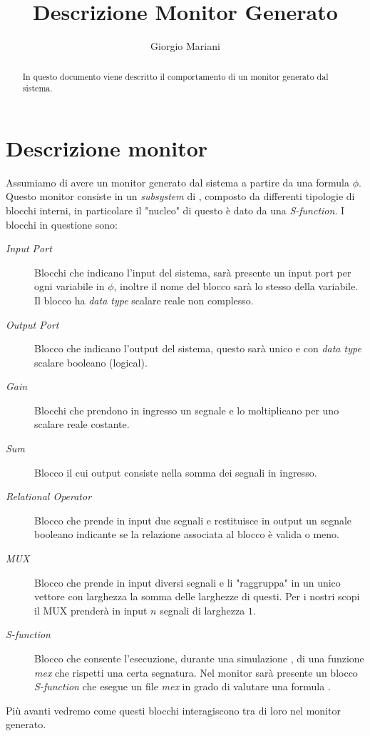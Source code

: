 \documentclass[10pt,a4paper]{article}
\author{Giorgio Mariani}
\date{}
\title{Descrizione Monitor Generato}
\newcommand{\DataType}{\emph{data type}}
\newcommand{\SFunction}{\emph{S-function}}
\newcommand{\Iport}{\emph{Input Port}}
\newcommand{\Oport}{\emph{Output Port}}
\newcommand{\Gain}{\emph{Gain}}
\newcommand{\Sum}{\emph{Sum}}
\newcommand{\RelOp}{\emph{Relational Operator}}
\newcommand{\MUX}{\emph{MUX}}
\begin{document}
	\maketitle{}
	\begin{abstract}
		In questo documento viene descritto il comportamento di un monitor generato dal sistema.
	\end{abstract}
	
	\section{Descrizione monitor}
	Assumiamo di avere un monitor generato dal sistema a partire da una formula \BLTL{} $\phi$.
	Questo monitor consiste in un \emph{subsystem} di \Simulink{}, composto da differenti tipologie di blocchi interni, in particolare il "nucleo" di questo è dato da una \SFunction{}.
	I blocchi in questione sono:
	\begin{multicols}{3}
	\begin{description}
		\item [\Iport] Blocchi che indicano l'input del sistema, sarà presente un input port per ogni variabile in $\phi$, inoltre il nome del blocco sarà lo stesso della variabile. Il blocco ha \DataType{}  scalare reale non complesso.
		\item [\Oport] Blocco che indicano l'output del sistema, questo sarà unico e con \DataType{} scalare booleano (logical).
		\item [\Gain] Blocchi che prendono in ingresso un segnale e lo moltiplicano per uno scalare reale costante.
		\item[\Sum] Blocco il cui output consiste nella somma dei segnali in ingresso.
		\item [\RelOp] Blocco che prende in input due segnali e restituisce in output un segnale booleano indicante se la relazione associata al blocco è valida o meno.
		\item [\MUX] Blocco che prende in input diversi segnali e li "raggruppa" in un unico vettore con larghezza la somma delle larghezze di questi. Per i nostri scopi il MUX prenderà in input $n$ segnali di larghezza $1$.
		\item [\SFunction{}] Blocco che consente l'esecuzione, durante una simulazione \Simulink{}, di una funzione \emph{mex} che rispetti una certa segnatura. Nel monitor sarà presente un blocco \SFunction{} che esegue un file \emph{mex} in grado di valutare una formula \BLTLstar{}.		
	\end{description}
	\end{multicols}
	Più avanti vedremo come questi blocchi interagiscono tra di loro nel monitor generato. 
	
\end{document}

